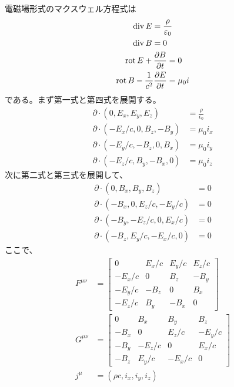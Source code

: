     電磁場形式のマクスウェル方程式は
    \begin{gather*}
        \begin{aligned}
            \operatorname{div} E &= \frac{\rho}{\varepsilon_0}\\
            \operatorname{div} B &= 0
        \end{aligned}\\
        \begin{aligned}
            \operatorname{rot} E + \pdv{B}{t} &= 0\\
            \operatorname{rot} B - \frac{1}{c^2}\pdv{E}{t} &= \mu_0 i
        \end{aligned}
    \end{gather*}
    である。まず第一式と第四式を展開する。
    \begin{align*}
        \partial \cdot (0, E_x, E_y, E_z) &= \frac{\rho}{\epsilon_0}\\
        \partial \cdot (-E_x/c, 0, B_z, -B_y) &= \mu_0 i_x\\
        \partial \cdot (-E_y/c, -B_z, 0, B_x) &= \mu_0 i_y\\
        \partial \cdot (-E_z/c, B_y, -B_x, 0) &= \mu_0 i_z
    \end{align*}
    次に第二式と第三式を展開して、
    \begin{align*}
        \partial \cdot (0, B_x, B_y, B_z) &= 0\\
        \partial \cdot (-B_x, 0, E_z/c, -E_y/c) &= 0\\
        \partial \cdot (-B_y, -E_z/c, 0, E_x/c) &= 0\\
        \partial \cdot (-B_z, E_y/c, -E_x/c, 0) &= 0
    \end{align*}
    ここで、
    \begin{align*}
        F^{\mu\nu} &=
        \begin{bmatrix}
            0 & E_x / c & E_y / c & E_z / c\\
            -E_x / c & 0 & B_z & -B_y\\
            -E_y / c & -B_z & 0 & B_x\\
            -E_z / c & B_y & -B_x & 0
        \end{bmatrix}\\
        G^{\mu\nu} &=
        \begin{bmatrix}
            0 & B_x & B_y & B_z\\
            -B_x & 0 & E_z / c & -E_y / c\\
            -B_y & -E_z / c & 0 & E_x / c\\
            -B_z & E_y / c & -E_x / c & 0
        \end{bmatrix}\\
        j^\mu &= (\rho c, i_x, i_y, i_z)
    \end{align*}
